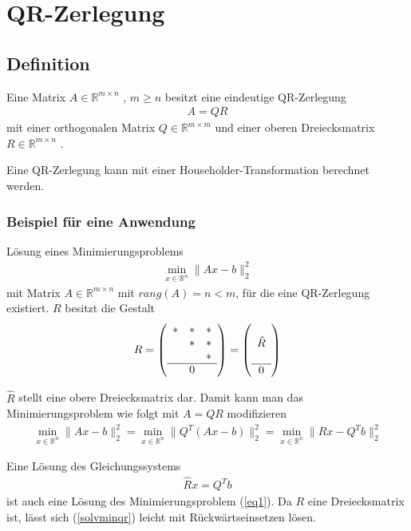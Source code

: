 \chapter{QR-Zerlegung}
\section{Definition}
Eine Matrix $A \in \mathbb{R}^{m \times n}$ , $m \ge n$ besitzt eine eindeutige QR-Zerlegung
\begin{align}
A = QR
\end{align}
mit einer orthogonalen Matrix $ Q \in \mathbb{R}^{m \times m} $ und einer oberen Dreiecksmatrix $ R \in \mathbb{R}^{m \times n}$ \cite{num1}.

Eine QR-Zerlegung kann mit einer Householder-Transformation berechnet werden.

\subsection{Beispiel für eine Anwendung}
Lösung eines Minimierungsproblems
\begin{align}
\min_{x \in \mathbb{R}^n} \|Ax-b\|_2^2 \label{eq1}
\end{align}
mit Matrix $A \in \mathbb{R}^{m\times n}$ mit $rang(A) = n < m$, für die eine QR-Zerlegung existiert.
$R$ besitzt die Gestalt 
\begin{align*}
R=	
\left(\begin{array}{ccc}
*&*&* \\ 
&*&* \\ 
& &* \\ \hline
& 0 &
\end{array} \right)
=
\left(\begin{array}{c}
\\ 
\hat{R} \\ 
\\ \hline
0
\end{array} \right) 
\end{align*}

$\hat{R}$ stellt eine obere Dreiecksmatrix dar.
Damit kann man das Minimierungsproblem wie folgt mit $A=QR$ modifizieren
\begin{align}
\min_{x \in \mathbb{R}^n} \|Ax-b\|_2^2 =
\min_{x \in \mathbb{R}^n} \|Q^T(Ax-b)\|_2^2 =
\min_{x \in \mathbb{R}^n} \|Rx-Q^Tb\|_2^2
\end{align}

Eine Lösung des Gleichungssystems
\begin{align}
\hat{R}x=Q^Tb \label{solvminqr}
\end{align}
ist auch eine Lösung des Minimierungsproblem (\ref{eq1}). Da $R$ eine Dreiecksmatrix ist, lässt sich (\ref{solvminqr}) leicht mit Rückwärtseinsetzen  lösen.


